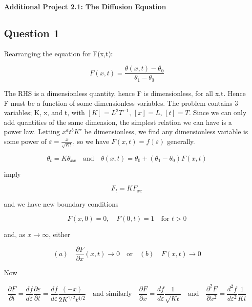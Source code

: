 \documentclass[10pt,a4paper]{report}
\begin{document}
\textbf{Additional Project 2.1: The Diffusion Equation}
\thispagestyle{empty}

\newpage

\subsection*{Question 1}

Rearranging the equation for F(x,t):

\begin{equation*}
F(x,t)=\frac{\theta(x,t)- \theta_0}{\theta_1 - \theta_0}  
\end{equation*}

The RHS is a dimensionless quantity, hence F is dimensionless, for all x,t. Hence F must be a function of some dimensionless variables. The problem contains 3 variables; K, x, and t, with $[K]=L^2T^{-1}$, $[x]=L$, $[t]=T$. Since we can only add quantities of the same dimension, the simplest relation we can have is a power law. Letting  $x^a t^b K^c$ be dimensionless, we find any dimensionless variable is some power of $\varepsilon = \frac{x}{\sqrt{Kt}}$, so we have $F(x,t)=f(\varepsilon)$ generally.\par

\begin{equation*}
\theta_t=K\theta_{xx} \quad \text{and} \quad \theta(x,t)=\theta_0+(\theta_1 - \theta_0)F(x,t)
\end{equation*}

imply 

\begin{equation*}
F_t=KF_{xx}
\end{equation*}

and we have new boundary conditions

\begin{equation*}
F(x,0)=0, \quad F(0,t)=1 \quad \text{for } t>0
\end{equation*}

and, as $x \rightarrow \infty$, either

\begin{equation*}
(a) \quad \frac{\partial F}{\partial x}(x,t) \rightarrow 0 \quad \text{or} \quad (b)\quad F(x,t) \rightarrow 0
\end{equation*}

Now 

\begin{equation} \label{*}
\frac{\partial F}{\partial t} = \frac{df}{d\varepsilon}\frac{\partial \varepsilon}{\partial t} = 
\frac{df}{d\varepsilon}\frac{(-x)}{2K^{1/2}t^{4/2}} \quad \text{and similarly} \quad \frac{\partial F}{\partial x}=\frac{df}{d\varepsilon}\frac{1}{\sqrt{Kt}} \quad \text{and} \quad  \frac{\partial^2 F}{\partial x^2}=\frac{d^2f}{d\varepsilon^2}\frac{1}{Kt} \tag{*}
\end{equation}
\end{document}
